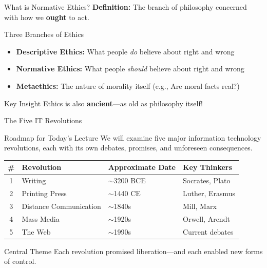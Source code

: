 \documentclass[aspectratio=169,11pt]{beamer}
\begin{document}
\begin{frame}{What is Normative Ethics?}
\textbf{Definition:} The branch of philosophy concerned with how we \textbf{ought} to act.

\vspace{0.5em}
\begin{block}{Three Branches of Ethics}
\begin{itemize}
  \item \textbf{Descriptive Ethics:} What people \textit{do} believe about right and wrong
  \item \textbf{Normative Ethics:} What people \textit{should} believe about right and wrong
  \item \textbf{Metaethics:} The nature of morality itself (e.g., Are moral facts real?)
\end{itemize}
\end{block}

\vspace{0.3em}
\begin{alertblock}{Key Insight}
Ethics is also \textbf{ancient}---as old as philosophy itself!
\end{alertblock}
\end{frame}

\begin{frame}{The Five IT Revolutions}
\begin{block}{Roadmap for Today's Lecture}
We will examine five major information technology revolutions, each with its own debates, promises, and unforeseen consequences.
\end{block}

\vspace{0.3em}
\begin{table}
\centering
\small
\begin{tabular}{@{}clll@{}}
\toprule
\textbf{\#} & \textbf{Revolution} & \textbf{Approximate Date} & \textbf{Key Thinkers} \\
\midrule
1 & Writing & $\sim$3200 BCE & Socrates, Plato \\
2 & Printing Press & $\sim$1440 CE & Luther, Erasmus \\
3 & Distance Communication & $\sim$1840s & Mill, Marx \\
4 & Mass Media & $\sim$1920s & Orwell, Arendt \\
5 & The Web & $\sim$1990s & Current debates \\
\bottomrule
\end{tabular}
\end{table}

\vspace{0.3em}
\begin{exampleblock}{Central Theme}
Each revolution promised liberation---and each enabled new forms of control.
\end{exampleblock}
\end{frame}
\end{document}
